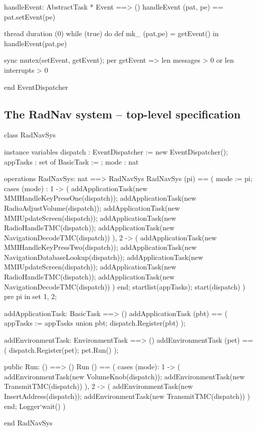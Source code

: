 \begin{vdm_al}
  handleEvent: AbstractTask * Event ==> ()
  handleEvent (pat, pe) == pat.setEvent(pe)

thread
  duration (0)
    while (true) do
      def mk_ (pat,pe) = getEvent() in
        handleEvent(pat,pe)

sync
  mutex(setEvent, getEvent);
  per getEvent => len messages > 0 or len interrupts > 0

end EventDispatcher
\end{vdm_al}

\subsection{The RadNav system -- top-level specification}

\begin{vdm_al}
class RadNavSys

instance variables
  dispatch : EventDispatcher := new EventDispatcher();
  appTasks : set of BasicTask := {};
  mode : nat 

operations
  RadNavSys: nat ==> RadNavSys
  RadNavSys (pi) ==
   ( mode := pi;
     cases (mode) :
       1 -> ( addApplicationTask(new MMIHandleKeyPressOne(dispatch));
              addApplicationTask(new RadioAdjustVolume(dispatch));
              addApplicationTask(new MMIUpdateScreen(dispatch));
              addApplicationTask(new RadioHandleTMC(dispatch));
	      addApplicationTask(new NavigationDecodeTMC(dispatch)) ),
       2 -> ( addApplicationTask(new MMIHandleKeyPressTwo(dispatch));
              addApplicationTask(new NavigationDatabaseLookup(dispatch));
              addApplicationTask(new MMIUpdateScreen(dispatch));
              addApplicationTask(new RadioHandleTMC(dispatch));
     	      addApplicationTask(new NavigationDecodeTMC(dispatch)) )
     end;
     startlist(appTasks); start(dispatch) )
   pre pi in set {1, 2};

  addApplicationTask: BasicTask ==> ()
  addApplicationTask (pbt) ==
   ( appTasks := appTasks union {pbt};
     dispatch.Register(pbt) );

  addEnvironmentTask: EnvironmentTask ==> ()
  addEnvironmentTask (pet) ==
   ( dispatch.Register(pet);
     pet.Run() );

  public Run: () ==> ()
  Run () ==
   ( cases (mode):
       1 -> ( addEnvironmentTask(new VolumeKnob(dispatch));
              addEnvironmentTask(new TransmitTMC(dispatch)) ),
       2 -> ( addEnvironmentTask(new InsertAddress(dispatch));
              addEnvironmentTask(new TransmitTMC(dispatch)) )
     end;
     Logger`wait() )

end RadNavSys
\end{vdm_al}
